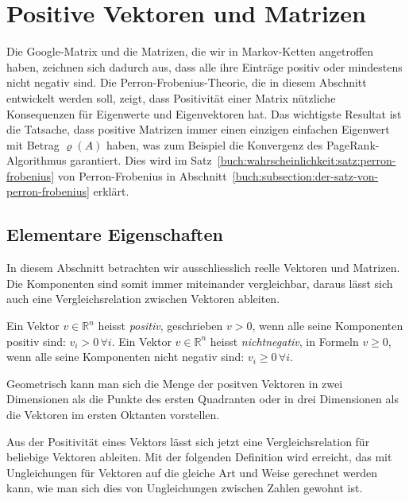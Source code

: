 %
%
%
\section{Positive Vektoren und Matrizen
\label{buch:section:positive-vektoren-und-matrizen}}
Die Google-Matrix und die Matrizen, die wir in Markov-Ketten angetroffen
%
haben, zeichnen sich dadurch aus, dass alle ihre Einträge positiv oder
mindestens nicht negativ sind.
Die Perron-Frobenius-Theorie, die in diesem Abschnitt entwickelt
%
werden soll, zeigt, dass Positivität einer Matrix nützliche
Konsequenzen für Eigenwerte und Eigenvektoren hat.
Das wichtigste Resultat ist die Tatsache, dass positive Matrizen immer
einen einzigen einfachen Eigenwert mit Betrag $\varrho(A)$ haben,
was zum Beispiel die Konvergenz des PageRank-Algorithmus garantiert.
Dies wird im Satz~\ref{buch:wahrscheinlichkeit:satz:perron-frobenius}
von Perron-Frobenius in
Abschnitt~\ref{buch:subsection:der-satz-von-perron-frobenius}
erklärt.

%
%
\subsection{Elementare Eigenschaften
\label{buch:subsection:elementare-eigenschaften}}
In diesem Abschnitt betrachten wir ausschliesslich reelle Vektoren
und Matrizen.
Die Komponenten sind somit immer miteinander vergleichbar, daraus
lässt sich auch eine Vergleichsrelation zwischen Vektoren
ableiten.

\begin{definition}
Ein Vektor $v\in\mathbb{R}^n$ heisst {\em positiv}, geschrieben
$v>0$, wenn alle seine Komponenten positiv sind: $v_i>0\,\forall i$.
Ein Vektor $v\in\mathbb{R}^n$ heisst {\em nichtnegativ}, in Formeln
$v\ge 0$, wenn alle
seine Komponenten nicht negativ sind: $v_i\ge 0\,\forall i$.
%
%
\end{definition}

Geometrisch kann man sich die Menge der positven Vektoren in zwei Dimensionen
als die Punkte des ersten Quadranten oder in drei Dimensionen als die
%
%
Vektoren im ersten Oktanten vorstellen.

Aus der Positivität eines Vektors lässt sich jetzt eine Vergleichsrelation
für beliebige Vektoren ableiten.
Mit der folgenden Definition wird erreicht, das mit Ungleichungen für Vektoren
auf die gleiche Art und Weise gerechnet werden kann, wie man sich
dies von Ungleichungen zwischen Zahlen gewohnt ist.

